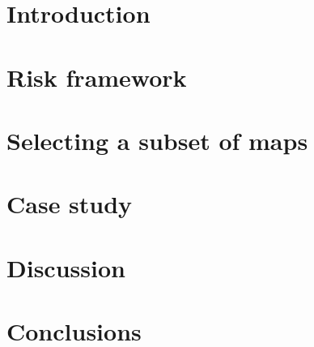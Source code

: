 \documentclass[times]{eqeauth}
\begin{document}
\maketitle


\section{Introduction}
\vspace{-2pt}
\label{sec:introOpt}


\section{Risk framework}
\label{sec:framework}


\section{Selecting a subset of maps}
\label{sec:selection}


\section{Case study}
\vspace{-2pt}
\label{sec:case}


\section{Discussion}
\vspace{-2pt}
\label{sec:discussOpt}


\section{Conclusions}
\vspace{-2pt}
\label{sec:conclusionsOpt}



\end{document}
